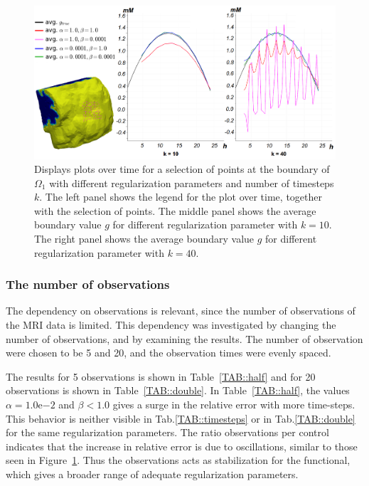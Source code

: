 \documentclass[11pt,a4paper]{article}
\begin{document}
\begin{figure}
\centering
\includegraphics[scale=0.21]{boundary_control.png}  
\caption{ Displays plots over time for a selection of points at the boundary of $\Omega_1$ with different regularization parameters and number of timesteps $k$. The left panel shows the legend for the plot over time, together with the selection of points. The middle panel shows the average boundary value $g$ for different regularization parameter with $k=10$. The right panel shows the average boundary value $g$ for different regularization parameter with $k=40$.  }
\label{boundarycontrol}
\end{figure}

\subsubsection{The number of observations}
The dependency on observations is relevant, since the number of observations of the MRI data is limited. This dependency was investigated by changing the number of observations, and by examining the results. The number of observation were chosen to be 5 and 20, and the observation times were evenly spaced. 

The results for 5 observations is shown in Table~\ref{TAB::half} and for 20 observations is shown in Table~\ref{TAB::double}. In Table~\ref{TAB::half}, the values $\alpha =1.0\mathrm{e}{-2}$ and $\beta<1.0$ gives a surge in the relative error with more time-steps. This behavior is neither visible in Tab.\ref{TAB::timesteps} or in  Tab.\ref{TAB::double} for the same regularization parameters. The ratio observations per control indicates that the increase in relative error is due to oscillations, similar to those seen in Figure~\ref{boundarycontrol}. Thus the observations acts as stabilization for the functional, which gives a broader range of adequate regularization parameters.
\end{document}
